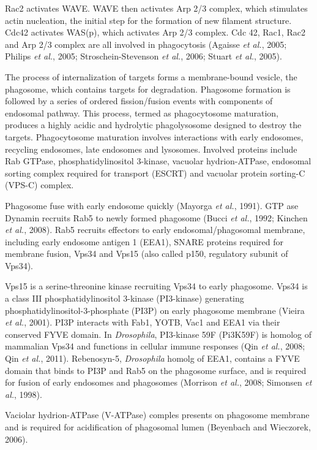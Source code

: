 \documentclass[11pt]{article}
\begin{document}
\begin{sloppypar}
Rac2 activates WAVE. 
WAVE then activates Arp 2/3 complex, which stimulates actin nucleation, the initial step for the formation of new filament structure. 
Cdc42 activates WAS(p), which activates Arp 2/3 complex. 
Cdc 42, Rac1, Rac2 and Arp 2/3 complex are all involved in phagocytosis (Agaisse \textit{et al.}, 2005; Philips \textit{et al.}, 2005; Stroschein-Stevenson \textit{et al.}, 2006; Stuart \textit{et al.}, 2005).
\par
The process of internalization of targets forms a membrane-bound vesicle, the phagosome, which contains targets for degradation. 
Phagosome formation is followed by a series of ordered fission/fusion events with components of endosomal pathway. 
This process, termed as phagocytosome maturation, produces a highly acidic and hydrolytic phagolysosome designed to destroy the targets. 
Phagocytosome maturation involves interactions with early endosomes, recycling endosomes, late endosomes and lysosomes. 
Involved proteins include Rab GTPase, phosphatidylinositol 3-kinase, vacuolar hydrion-ATPase, endosomal sorting complex required for transport (ESCRT) and vacuolar protein sorting-C (VPS-C) complex. 
\par
Phagosome fuse with early endosome quickly (Mayorga \textit{et al.}, 1991). 
GTP ase Dynamin recruits Rab5 to newly formed phagosome (Bucci \textit{et al.}, 1992; Kinchen \textit{et al.}, 2008). 
Rab5 recruits effectors to early endosomal/phagosomal membrane, including early endosome antigen 1 (EEA1), SNARE proteins required for membrane fusion, Vps34 and Vps15 (also called p150, regulatory subunit of Vps34). 
\par
Vps15 is a serine-threonine kinase recruiting Vps34 to early phagosome. 
Vps34 is a class III phosphatidylinositol 3-kinase (PI3-kinase) generating phosphatidylinositol-3-phosphate (PI3P) on early phagosome membrane (Vieira \textit{et al.}, 2001). 
PI3P interacts with Fab1, YOTB, Vac1 and EEA1 via their conserved FYVE domain. 
In \textit{Drosophila}, PI3-kinase 59F (Pi3K59F) is homolog of mammalian Vps34 and functions in cellular immune responses (Qin \textit{et al.}, 2008; Qin \textit{et al.}, 2011). 
Rebenosyn-5, \textit{Drosophila} homolg of EEA1, contains a FYVE domain that binds to PI3P and Rab5 on the phagosome surface, and is required for fusion of early endosomes and phagosomes (Morrison \textit{et al.}, 2008; Simonsen \textit{et al.}, 1998). 
\par
Vaciolar hydrion-ATPase (V-ATPase) comples presents on phagosome membrane and is required for acidification of phagosomal lumen (Beyenbach and Wieczorek, 2006). 

\end{sloppypar}
\end{document}
